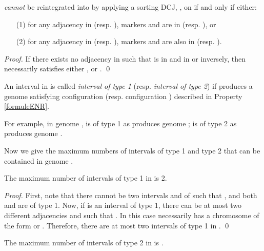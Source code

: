 \documentclass{llncs}
\begin{document}
\begin{property}
 \emph{cannot} be reintegrated into  by
applying a sorting DCJ,  , on  if and only if either:

\begin{itemize} 
\item[(1)] for any adjacency  in 
  (resp. ), markers  and  are in
   (resp. ), or

\item[(2)] for any adjacency  in  (resp. ), markers  and  are also in  (resp. ). \end{itemize}

\label{formuleENR}
\end{property}
\begin{proof}
If there exists no  adjacency  in  such that  is in  and  in  or inversely, then  necessarily satisfies either , or . \qed
\end{proof}






\begin{definition}
An interval  in   is called
\emph{interval of type 1} (resp. \emph{interval of type 2}) if  produces a genome  satisfying configuration   (resp.  configuration ) described in Property \ref{formuleENR}.
\end{definition}


For example, in genome  ,   is of type 1 as   produces genome 
 ;   is of type 2 as   produces genome  .

Now we give the maximum numbers of intervals of type 1 and type 2 that can be contained in genome .

\begin{lemma}
The maximum number of intervals of type 1 in  is 2.
\label{maxType1}
\end{lemma}

\begin{proof}
First, note that there cannot be two intervals  and  of  
such that , and both   and  are of type 1.
Now, if  is an interval of type 1, there can be at most two different 
adjacencies  and  such that 
. In this case  necessarily has a chromosome of the form  or .
Therefore, there are at most two intervals of type 1 in .   \qed




\end{proof}

\begin{lemma}
The maximum number of intervals of type 2 in   is .
\label{maxType2}
\end{lemma}
\end{document}
